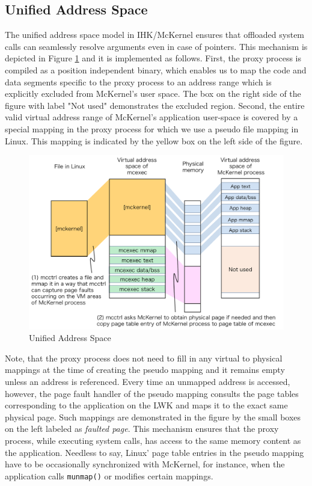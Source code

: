 \documentclass[twoside,11pt,fleqn]{book}
\begin{document}
\subsection{Unified Address Space}
The unified address space model in IHK/McKernel ensures that offloaded system
calls can seamlessly resolve arguments even in case of pointers.
This mechanism is depicted in Figure \ref{fig:unified_address_space}
and it is implemented as follows.
First, the proxy process is compiled as a position independent binary,
which enables us to map the code and data segments specific to the
proxy process to an address range which is explicitly excluded from
McKernel's user space.
The box on the right side of the figure with label "Not used"
demonstrates the excluded region.
Second, the entire valid virtual address range of McKernel's
application user-space
is covered by a special mapping in the proxy process for which
we use a pseudo file mapping in Linux. This mapping is indicated
by the yellow box on the left side of the figure.

\begin{figure}[h!]
\centering
\includegraphics[width=14cm]{figs/unified_address_space.pdf}
\vspace{-0em}\caption{Unified Address Space}
\label{fig:unified_address_space}
\vspace{-0em}
\end{figure}

Note, that the proxy process does not need to fill in any virtual
to physical mappings at the time of creating the pseudo mapping and it
remains empty unless an address is referenced.
Every time an unmapped address is accessed, however, the page fault
handler of the pseudo mapping consults the page tables corresponding
to the application on
the LWK and maps it to the exact same physical page.
Such mappings are demonstrated in the figure by the small boxes
on the left labeled as \textit{faulted page}.
This mechanism
ensures that the proxy process, while executing system calls,
has access to the same memory content as the application.
Needless to say, Linux' page table entries in the pseudo mapping
have to be occasionally
synchronized with McKernel,
for instance, when the application
calls \texttt{munmap()} or modifies certain mappings.
\end{document}
